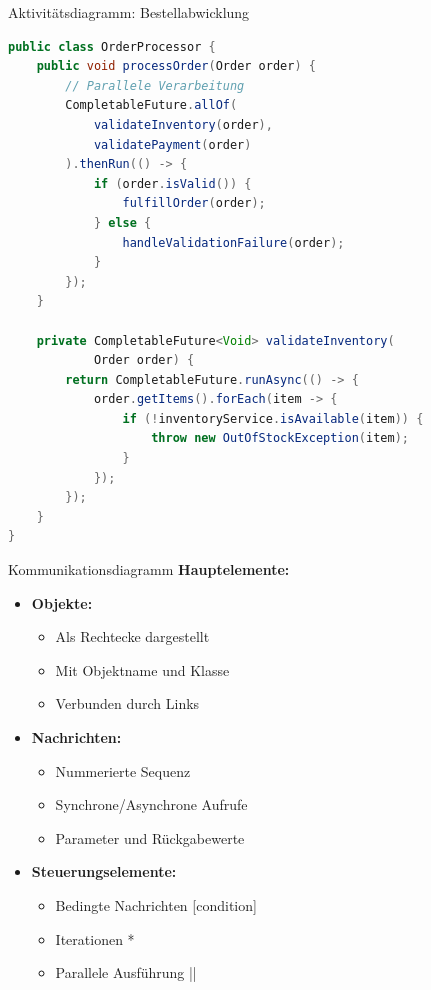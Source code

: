 \begin{example2}{Aktivitätsdiagramm: Bestellabwicklung}
\begin{lstlisting}[language=Java, style=basesmol]
public class OrderProcessor {
    public void processOrder(Order order) {
        // Parallele Verarbeitung
        CompletableFuture.allOf(
            validateInventory(order),
            validatePayment(order)
        ).thenRun(() -> {
            if (order.isValid()) {
                fulfillOrder(order);
            } else {
                handleValidationFailure(order);
            }
        });
    }
    
    private CompletableFuture<Void> validateInventory(
            Order order) {
        return CompletableFuture.runAsync(() -> {
            order.getItems().forEach(item -> {
                if (!inventoryService.isAvailable(item)) {
                    throw new OutOfStockException(item);
                }
            });
        });
    }
}
\end{lstlisting}
\end{example2}

\begin{definition}{Kommunikationsdiagramm}
\textbf{Hauptelemente:}
\begin{itemize}
    \item \textbf{Objekte:}
    \begin{itemize}
        \item Als Rechtecke dargestellt
        \item Mit Objektname und Klasse
        \item Verbunden durch Links
    \end{itemize}
    
    \item \textbf{Nachrichten:}
    \begin{itemize}
        \item Nummerierte Sequenz
        \item Synchrone/Asynchrone Aufrufe
        \item Parameter und Rückgabewerte
    \end{itemize}
    
    \item \textbf{Steuerungselemente:}
    \begin{itemize}
        \item Bedingte Nachrichten [condition]
        \item Iterationen *
        \item Parallele Ausführung || 
    \end{itemize}
\end{itemize}
\end{definition}

